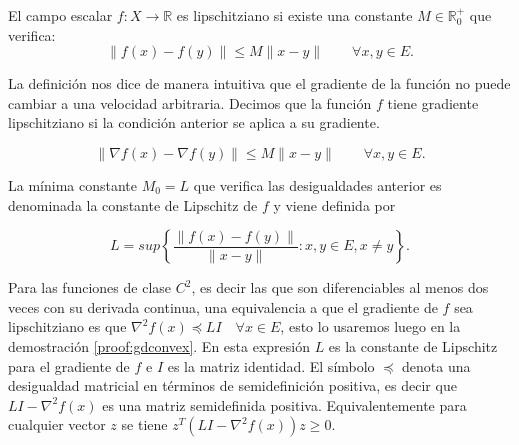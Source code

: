 \begin{definicion}
    El campo escalar $f:X \rightarrow \mathbb{R}$ es lipschitziano si existe una constante $M \in \mathbb{R}_0^+$ que verifica:
    $$ \| f(x) - f(y) \| \leq M \| x - y \| \qquad \forall x,y \in E.$$
\end{definicion}

La definición nos dice de manera intuitiva que el gradiente de la función no puede cambiar a una velocidad arbitraria. Decimos que la función $f$ tiene gradiente lipschitziano si la condición anterior se aplica a su gradiente.

$$\| \nabla f(x) - \nabla f(y) \| \leq M \| x - y \| \qquad \forall x,y \in E .$$


La mínima constante $M_0=L$ que verifica las desigualdades anterior es denominada la constante de Lipschitz de $f$ y viene definida por 

$$L=sup \left \{ \frac{\|f(x)-f(y)\|}{\|x - y \|} : x,y \in E, x \neq y \right \}.$$



Para las funciones de clase $C^2$, es decir las que son diferenciables al menos dos veces con su derivada continua, una equivalencia a que el gradiente de $f$ sea lipschitziano es que $\nabla^2 f(x) \preceq LI \quad \forall x \in E$, esto lo usaremos luego en la demostración \ref{proof:gdconvex}. En esta expresión $L$ es la constante de Lipschitz para el gradiente de $f$ e $I$ es la matriz identidad. El símbolo $\preceq$ denota una desigualdad matricial en términos de semidefinición positiva, es decir que $LI - \nabla^2f(x)$ es una matriz semidefinida positiva. Equivalentemente para cualquier vector $z$ se tiene $z^T \left ( LI - \nabla^2f(x) \right )z \geq 0$. 

